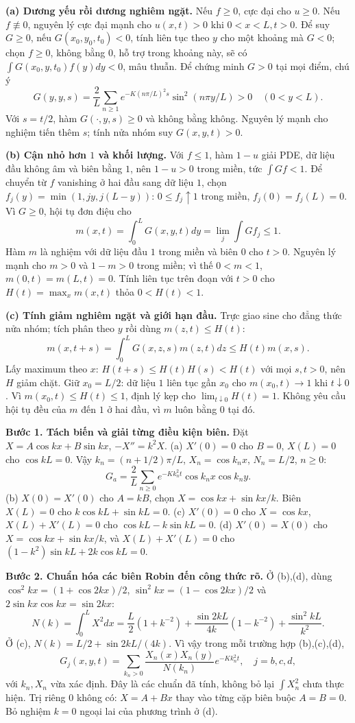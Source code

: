 \textbf{(a) Dương yếu rồi dương nghiêm ngặt.}
Nếu $f\ge0$, cực đại cho $u\ge0$. Nếu $f\not\equiv0$, nguyên lý cực đại mạnh cho $u(x,t)>0$ khi $0<x<L,t>0$. Để suy $G\ge0$, nếu $G(x_0,y_0,t_0)<0$, tính liên tục theo $y$ cho một khoảng mà $G<0$; chọn $f\ge0$, không bằng $0$, hỗ trợ trong khoảng này, sẽ có $\int G(x_0,y,t_0)f(y)dy<0$, mâu thuẫn. Để chứng minh $G>0$ tại mọi điểm, chú ý
\[G(y,y,s)=\frac2L\sum_{n\ge1}e^{-K(n\pi/L)^2s}\sin^2(n\pi y/L)>0\quad(0<y<L).\]
Với $s=t/2$, hàm $G(\cdot,y,s)\ge0$ và không bằng không. Nguyên lý mạnh cho nghiệm tiến thêm $s$; tính nửa nhóm suy $G(x,y,t)>0$.

\textbf{(b) Cận nhỏ hơn $1$ và khối lượng.}
Với $f\le1$, hàm $1-u$ giải PDE, dữ liệu đầu không âm và biên bằng $1$, nên $1-u>0$ trong miền, tức $\int Gf<1$. Để chuyển từ $f$ vanishing ở hai đầu sang dữ liệu $1$, chọn $f_j(y)=\min(1,jy,j(L-y))$: $0\le f_j\uparrow1$ trong miền, $f_j(0)=f_j(L)=0$. Vì $G\ge0$, hội tụ đơn điệu cho
\[m(x,t)=\int_0^LG(x,y,t)dy=\lim_j\int Gf_j\le1.\]
Hàm $m$ là nghiệm với dữ liệu đầu $1$ trong miền và biên $0$ cho $t>0$. Nguyên lý mạnh cho $m>0$ và $1-m>0$ trong miền; vì thế $0<m<1$, $m(0,t)=m(L,t)=0$. Tính liên tục trên đoạn với $t>0$ cho $H(t)=\max_xm(x,t)$ thỏa $0<H(t)<1$.

\textbf{(c) Tính giảm nghiêm ngặt và giới hạn đầu.}
Trực giao sine cho đẳng thức nửa nhóm; tích phân theo $y$ rồi dùng $m(z,t)\le H(t)$:
\[m(x,t+s)=\int_0^LG(x,z,s)m(z,t)dz\le H(t)m(x,s).\]
Lấy maximum theo $x$: $H(t+s)\le H(t)H(s)<H(t)$ với mọi $s,t>0$, nên $H$ giảm chặt. Giữ $x_0=L/2$: dữ liệu $1$ liên tục gần $x_0$ cho $m(x_0,t)\to1$ khi $t\downarrow0$. Vì $m(x_0,t)\le H(t)\le1$, định lý kẹp cho $\lim_{t\downarrow0}H(t)=1$. Không yêu cầu hội tụ đều của $m$ đến $1$ ở hai đầu, vì $m$ luôn bằng $0$ tại đó.

\textbf{Bước 1. Tách biến và giải từng điều kiện biên.}
Đặt $X=A\cos kx+B\sin kx$, $-X''=k^2X$.
(a) $X'(0)=0$ cho $B=0$, $X(L)=0$ cho $\cos kL=0$. Vậy $k_n=(n+1/2)\pi/L$, $X_n=\cos k_nx$, $N_n=L/2$, $n\ge0$:
\[G_a=\frac2L\sum_{n\ge0}e^{-Kk_n^2t}\cos k_nx\cos k_ny.\]
(b) $X(0)=X'(0)$ cho $A=kB$, chọn $X=\cos kx+\sin kx/k$. Biên $X(L)=0$ cho $k\cos kL+\sin kL=0$.
(c) $X'(0)=0$ cho $X=\cos kx$, $X(L)+X'(L)=0$ cho $\cos kL-k\sin kL=0$.
(d) $X'(0)=X(0)$ cho $X=\cos kx+\sin kx/k$, và $X(L)+X'(L)=0$ cho $(1-k^2)\sin kL+2k\cos kL=0$.

\textbf{Bước 2. Chuẩn hóa các biên Robin đến công thức rõ.}
Ở (b),(d), dùng $\cos^2kx=(1+\cos2kx)/2$, $\sin^2kx=(1-\cos2kx)/2$ và $2\sin kx\cos kx=\sin2kx$:
\[N(k)=\int_0^LX^2dx
=\frac L2(1+k^{-2})+\frac{\sin2kL}{4k}(1-k^{-2})+\frac{\sin^2kL}{k^2}.\]
Ở (c), $N(k)=L/2+\sin2kL/(4k)$. Vì vậy trong mỗi trường hợp (b),(c),(d),
\[G_j(x,y,t)=\sum_{k_n>0}\frac{X_n(x)X_n(y)}{N(k_n)}e^{-Kk_n^2t},\quad j=b,c,d,\]
với $k_n,X_n$ vừa xác định. Đây là các chuẩn đã tính, không bỏ lại $\int X_n^2$ chưa thực hiện. Trị riêng $0$ không có: $X=A+Bx$ thay vào từng cặp biên buộc $A=B=0$. Bỏ nghiệm $k=0$ ngoại lai của phương trình ở (d).

